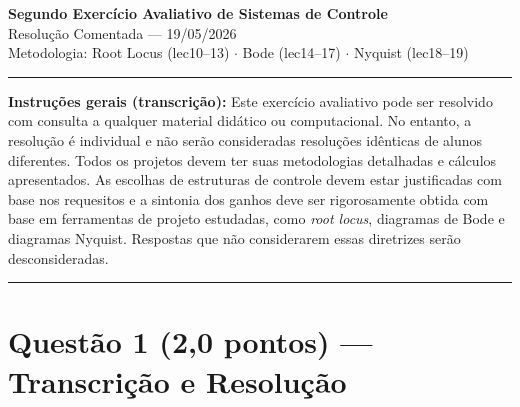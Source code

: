 \documentclass[12pt,a4paper]{article}
\begin{document}
\begin{center}
  {\Large\bfseries Segundo Exercício Avaliativo de Sistemas de Controle}\\[4pt]
  {\large Resolução Comentada — 19/05/2026}\\[4pt]
  {\normalsize Metodologia: Root Locus (lec10--13) $\cdot$ Bode (lec14--17) $\cdot$ Nyquist (lec18--19)}
\end{center}
\hrule\vspace{6pt}

\textbf{Instruções gerais (transcrição):}
Este exercício avaliativo pode ser resolvido com consulta a qualquer material
didático ou computacional. No entanto, a resolução é individual e não serão
consideradas resoluções idênticas de alunos diferentes. Todos os projetos devem
ter suas metodologias detalhadas e cálculos apresentados. As escolhas de
estruturas de controle devem estar justificadas com base nos requesitos e a
sintonia dos ganhos deve ser rigorosamente obtida com base em ferramentas de
projeto estudadas, como \textit{root locus}, diagramas de Bode e diagramas
Nyquist. Respostas que não considerarem essas diretrizes serão desconsideradas.

\vspace{8pt}\hrule\vspace{8pt}

\section*{Questão 1 \normalfont\small(2{,}0 pontos) — Transcrição e Resolução}
\end{document}
